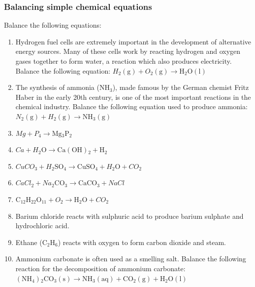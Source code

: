            \subsubsection{  Balancing simple chemical equations
        }
            \nopagebreak
        \label{m38726*id65193}Balance the following equations:\par 
        \label{m38726*id65199}\begin{enumerate}[noitemsep, label=\textbf{\arabic*}. ] 
            \label{m38726*uid17}\item Hydrogen fuel cells are extremely important in the development of alternative energy sources. Many of these cells work by reacting hydrogen and oxygen gases together to form water, a reaction which also produces electricity. Balance the following equation: ${{H}}_{2}\left(\mathrm{g}\right)+{{O}}_{2}\left(\mathrm{g}\right)\to \mathrm{H}{}_{2}\mathrm{O}\left(\mathrm{l}\right)$        \label{m38726*uid18}\item The synthesis of ammonia ($\mathrm{NH}{}_{3}$), made famous by the German chemist Fritz Haber in the early 20th century, is one of the most important reactions in the chemical industry. Balance the following equation used to produce ammonia:
${{N}}_{2}\left(\mathrm{g}\right)+{{H}}_{2}\left(\mathrm{g}\right)\to \mathrm{NH}{}_{3}\left(\mathrm{g}\right)$
        \label{m38726*uid19}\item 
          ${Mg}+{{P}}_{4}\to \mathrm{Mg}{}_{3}{\mathrm{P}}_{2}$
        \label{m38726*uid20}\item 
          ${Ca}+{{H}}_{2}\mathrm{O}\to \mathrm{Ca\left(OH\right)}{}_{2}+\mathrm{H}{}_{2}$        \label{m38726*uid21}\item 
          ${{CuCO}}_{3}+{{H}}_{2}{\mathrm{SO}}_{4}\to \mathrm{CuSO}{}_{4}+{{H}}_{2}\mathrm{O}+{{CO}}_{2}$
        \label{m38726*uid22}\item 
          ${{CaCl}}_{2}+{{Na}}_{2}{\mathrm{CO}}_{3}\to \mathrm{CaCO}{}_{3}+{NaCl}$        \label{m38726*uid23}\item 
          ${\mathrm{C}}_{12}{\mathrm{H}}_{22}{\mathrm{O}}_{11}+{{O}}_{2}\to \mathrm{H}{}_{2}\mathrm{O}+{{CO}}_{2}$
          \hspace{1ex}        \label{m38726*uid24}\item Barium chloride reacts with sulphuric acid to produce barium sulphate and hydrochloric acid.
        \label{m38726*uid25}\item Ethane (${\mathrm{C}}_{2}{\mathrm{H}}_{6}$) reacts with oxygen to form carbon dioxide and steam.
        \label{m38726*uid26}\item Ammonium carbonate is often used as a smelling salt. Balance the following reaction for the decomposition of ammonium carbonate:
$\left({\mathrm{NH}}_{4}\right){}_{2}{\mathrm{CO}}_{3}\left(\mathrm{s}\right)\to {\mathrm{NH}}_{3}\left(\mathrm{aq}\right)+{\mathrm{CO}}_{2}\left(\mathrm{g}\right)+\mathrm{H}{}_{2}\mathrm{O}\left(\mathrm{l}\right)$\hspace{1ex}        \end{enumerate}
